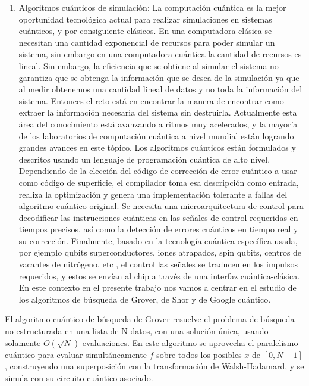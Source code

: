 \begin{enumerate}
    \item Algoritmos cuánticos de simulación: La computación cuántica es la mejor oportunidad tecnológica actual para realizar simulaciones en sistemas cuánticos, y por consiguiente clásicos. En una computadora clásica se necesitan una cantidad exponencial de recursos para poder simular un sistema, sin embargo en una computadora cuántica la cantidad de recursos es lineal. Sin embargo, la eficiencia que se obtiene al simular el sistema no garantiza que se obtenga la información que se desea de la simulación ya que al medir obtenemos una cantidad lineal de datos y no toda la información del sistema. Entonces el reto está en encontrar la manera de encontrar como extraer la información necesaria del sistema sin destruirla. Actualmente esta área del conocimiento está avanzando a ritmos muy acelerados, y la mayoría de los laboratorios de computación cuántica a nivel mundial están logrando grandes avances en este tópico.  Los algoritmos cuánticos están formulados y descritos usando un lenguaje de programación cuántica de alto nivel. Dependiendo de la elección del código de corrección de error cuántico a usar como código de superficie, el compilador toma esa descripción como entrada, realiza la optimización y genera una implementación tolerante a fallas del algoritmo cuántico original. Se necesita una microarquitectura de control para decodificar las instrucciones cuánticas en las señales de control requeridas en tiempos precisos, así como la detección de errores cuánticos en tiempo real y su corrección. Finalmente, basado en la tecnología cuántica específica usada, por ejemplo qubits superconductores, iones atrapados, spin qubits, centros de vacantes de nitrógeno, etc \cite{Nakahara_2008}, el control las señales se traducen en los impulsos requeridos, y estos se envían al chip a través de una interfaz cuántica-clásica.  En este contexto en el presente trabajo nos vamos a centrar en el estudio de los algoritmos de búsqueda de Grover, de Shor y de Google cuántico.
\end{enumerate}

El algoritmo cuántico de búsqueda de Grover resuelve el problema de búsqueda no estructurada en una lista de N datos, con una solución única, usando solamente $O(\sqrt{N})$ evaluaciones. En este algoritmo se aprovecha el paralelismo cuántico para evaluar simultáneamente $f$ sobre todos los posibles $x$ de $[0,N-1]$, construyendo una superposición con la transformación de Walsh-Hadamard, y se simula con su circuito cuántico asociado.

